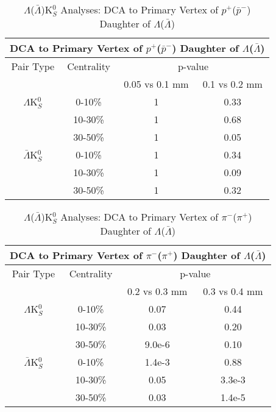 \documentclass[../AnalysisNoteJBuxton.tex]{subfiles}
\begin{document}
\begin{table}
 \centering
 \begin{tabular}{|c|c|c|c|}
 \multicolumn{4}{c}{DCA to Primary Vertex of $p^{+}$($\bar{p}^{-}$) Daughter of $\Lambda$($\bar{\Lambda}$)} \\
  \hline
  Pair Type & Centrality & \multicolumn{2}{c|}{p-value} \\
  \cline{3-4}
   & & 0.05 vs 0.1 mm & 0.1 vs 0.2 mm \\
  \hline
  $\Lambda$K$^{0}_{S}$ & 0-10\% & 1 & 0.33 \\
   & 10-30\% & 1 & 0.68 \\
   & 30-50\% & 1 & 0.05 \\
  \hline
  $\bar{\Lambda}$K$^{0}_{S}$ & 0-10\% & 1 & 0.34 \\
   & 10-30\% & 1 & 0.09 \\
   & 30-50\% & 1 & 0.32 \\
  \hline
 \end{tabular}
 \caption{$\Lambda$($\bar{\Lambda}$)K$^{0}_{S}$ Analyses: DCA to Primary Vertex of $p^{+}$($\bar{p}^{-}$) Daughter of $\Lambda$($\bar{\Lambda}$)}
 \label{tab:DcaToPrimVertexProtonDaughtOfLamLamK0}
\end{table}

\begin{table}
 \centering
 \begin{tabular}{|c|c|c|c|}
 \multicolumn{4}{c}{DCA to Primary Vertex of $\pi^{-}$($\pi^{+}$) Daughter of $\Lambda$($\bar{\Lambda}$)} \\
  \hline
  Pair Type & Centrality & \multicolumn{2}{c|}{p-value} \\
  \cline{3-4}
   & & 0.2 vs 0.3 mm & 0.3 vs 0.4 mm \\
  \hline
  $\Lambda$K$^{0}_{S}$ & 0-10\% & 0.07 & 0.44 \\
   & 10-30\% & 0.03 & 0.20 \\
   & 30-50\% & 9.0e-6 & 0.10 \\
  \hline
  $\bar{\Lambda}$K$^{0}_{S}$ & 0-10\% & 1.4e-3 & 0.88 \\
   & 10-30\% & 0.05 & 3.3e-3 \\
   & 30-50\% & 0.03 & 1.4e-5 \\
  \hline
 \end{tabular}
 \caption{$\Lambda$($\bar{\Lambda}$)K$^{0}_{S}$ Analyses: DCA to Primary Vertex of $\pi^{-}$($\pi^{+}$) Daughter of $\Lambda$($\bar{\Lambda}$)}
 \label{tab:DcaToPrimVertexPionDaughtOfLamLamK0}
\end{table}
\end{document}
